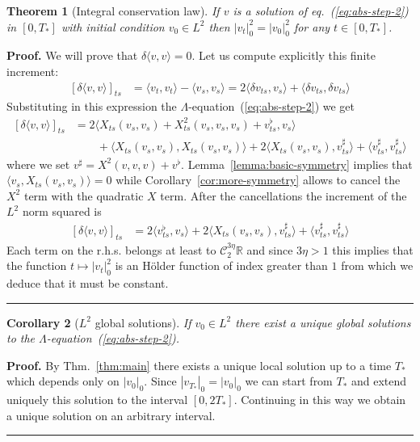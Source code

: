 \documentclass[a4paper,11pt,reqno]{article}
\newcommand{\der}{\delta}
\newcommand{\RR}{\mathbb{R}}
\newcommand{\CC}{\mathcal{C}}
\newtheorem{theorem}{Theorem}
\newtheorem{corollary}[theorem]{Corollary}
\newenvironment{proof}[1][Proof]{\textbf{#1.} }{\ \rule{0.5em}{0.5em}}
\begin{document}
\begin{theorem}[Integral conservation law]
If $v$ is a solution of eq.~(\ref{eq:abs-step-2}) in $[0,T_*]$ with initial condition $v_0 \in L^2$ then $|v_t|^2_0 = |v_0|_0^2$ for any $t \in [0,T_*]$.
\end{theorem}
\begin{proof}
We will prove that $\der \langle v,v \rangle  = 0$. Let us compute explicitly this finite increment:
\begin{equation*}
  \begin{split}
[\der \langle v,v \rangle]_{ts}  & = \langle v_t,v_t \rangle - \langle v_s,v_s \rangle
=  2 \langle \der v_{ts},v_s \rangle + \langle \der v_{ts},\der v_{ts} \rangle    
  \end{split}
\end{equation*}
Substituting in this expression the $\Lambda$-equation~(\ref{eq:abs-step-2}) we get
\begin{equation*}
  \begin{split}
[\der \langle v,v \rangle]_{ts}
& = 2  \langle X_{ts}(v_s,v_s)+X^2_{ts}(v_s,v_s,v_s) + v^\flat_{ts},v_s \rangle 
\\ & \qquad + \langle X_{ts}(v_s,v_s),X_{ts}(v_s,v_s) \rangle 
+ 2 \langle X_{ts}(v_s,v_s),v^{\sharp}_{ts} \rangle    
+  \langle v^{\sharp}_{ts},v^{\sharp}_{ts} \rangle    
  \end{split}
\end{equation*}
where we set $v^\sharp = X^2(v,v,v) +
v^\flat$. Lemma~\ref{lemma:basic-symmetry} implies that $\langle v_s,
X_{ts}(v_s,v_s) \rangle = 0$ while Corollary~\ref{cor:more-symmetry}
allows to cancel the $X^2$ term with the quadratic $X$ term. After the
cancellations the increment of the $L^2$ norm squared is  
\begin{equation*}
  \begin{split}
[\der \langle v,v \rangle]_{ts}
& = 2  \langle  v^\flat_{ts},v_s \rangle 
+ 2 \langle X_{ts}(v_s,v_s),v^{\sharp}_{ts} \rangle    
+  \langle v^{\sharp}_{ts},v^{\sharp}_{ts} \rangle    
  \end{split}
\end{equation*}
Each term  on the r.h.s. belongs at least to $\CC_2^{3\eta} \RR$ and
since $3\eta > 1$ this implies that the function $t \mapsto |v_t|^2_0$
is an H\"older function of index greater than $1$ from which we deduce
 that it
must be constant.
\end{proof}


\begin{corollary}[$L^2$ global solutions]
If $v_0 \in L^2$ there exist a unique global solutions to the $\Lambda$-equation~(\ref{eq:abs-step-2}).  
\end{corollary}
\begin{proof}
By Thm.~\ref{thm:main} there exists a unique local solution up to a time
$T_*$ which depends only on $|v_0|_0$. Since $|v_{T_*}|_0 = |v_{0}|_0$
we can start from $T_*$ and extend uniquely this solution to the interval
$[0,2T_*]$. Continuing in this way we obtain a unique solution on an
arbitrary interval. 
\end{proof}
\end{document}
